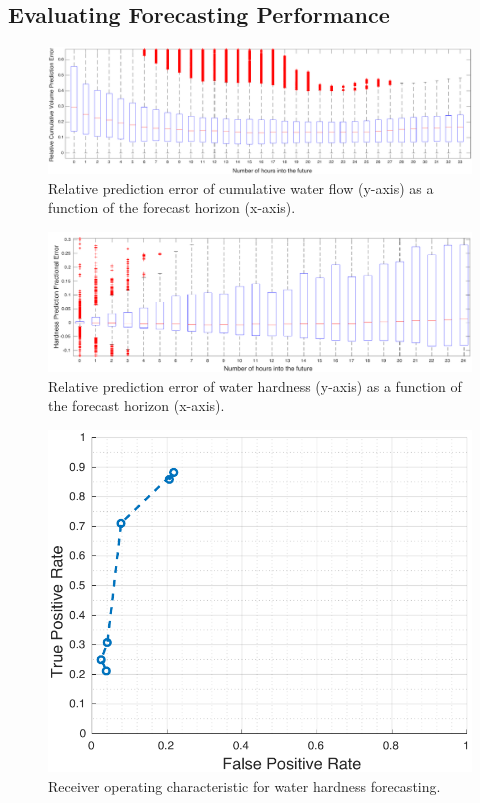 \subsection{Evaluating Forecasting Performance}
\label{sec:eval-forecasting}



\begin{figure}[!th]
\centering
\includegraphics[width=\textwidth]{water/rel_cum_vol_pred_err.pdf}
\caption{Relative prediction error of cumulative water flow (y-axis) as a function of the forecast horizon (x-axis).}
\label{fig:cum_vol_pred_err}
\end{figure}

\begin{figure}[!th]
\centering
\includegraphics[width=\textwidth]{water/rel_hardness_pred_error_154.pdf}
\caption{Relative prediction error of water hardness (y-axis) as a function of the forecast horizon (x-axis).}
\label{fig:rel_hardness_pred_error_154}
\end{figure}

\begin{figure}[!th]
\centering
\includegraphics[width=\textwidth]{water/ROC_154.pdf}
\caption{Receiver operating characteristic for water hardness forecasting.}
\label{fig:forecastingroc}
\end{figure}

